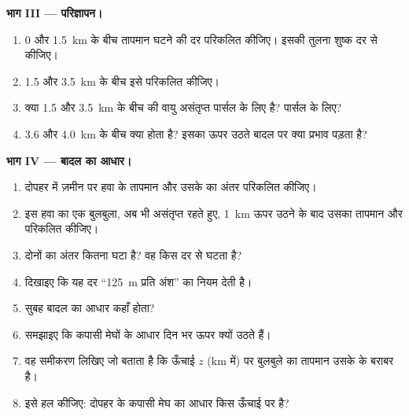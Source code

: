 \begin{problem}
\medskip
\noindent\textbf{भाग III --- परिज्ञापन।}
\begin{enumerate}[resume]
  \item \num{0} और \qty{1.5}{km} के बीच तापमान घटने की दर परिकलित कीजिए।
        इसकी तुलना शुष्क दर से कीजिए।
  \item \num{1.5} और \qty{3.5}{km} के बीच इसे परिकलित कीजिए।
  \item क्या \num{1.5} और \qty{3.5}{km} के बीच की वायु असंतृप्त पार्सल के लिए
         है?  पार्सल के लिए?
  \item \num{3.6} और \qty{4.0}{km} के बीच क्या होता है? इसका ऊपर उठते बादल पर क्या
        प्रभाव पड़ता है?
\end{enumerate}

\medskip
\noindent\textbf{भाग IV --- बादल का आधार।}
\begin{enumerate}[resume]
  \item दोपहर में ज़मीन पर हवा के तापमान और उसके  का अंतर
        परिकलित कीजिए।
  \item इस हवा का एक बुलबुला, अब भी असंतृप्त रहते हुए, \qty{1}{km} ऊपर उठने के
        बाद उसका तापमान और  परिकलित कीजिए।
  \item दोनों का अंतर कितना घटा है? वह किस दर से
        घटता है?
  \item दिखाइए कि यह दर ``\qty{125}{m} प्रति अंश'' का नियम देती है।
  \item सुबह बादल का आधार कहाँ होता?
  \item समझाइए कि कपासी मेघों के आधार दिन भर ऊपर क्यों उठते हैं।
  \item वह समीकरण लिखिए जो बताता है कि ऊँचाई $z$ (km में) पर बुलबुले का तापमान
        उसके  के बराबर है।
  \item इसे हल कीजिए: दोपहर के कपासी मेघ का आधार किस ऊँचाई पर है?
\end{enumerate}
\end{problem}
